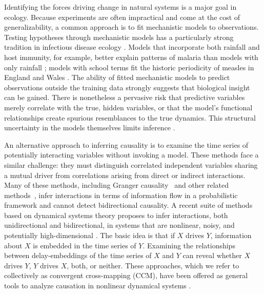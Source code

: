Identifying the forces driving change in natural systems is a major goal in ecology. 
Because experiments are often impractical and come at the cost of generalizability, a common approach is to fit mechanistic models to observations. 
Testing hypotheses through mechanistic models has a particularly strong tradition in infectious disease ecology \cite{KeelingRohani, AndersonMay, Kermack1927, Ross1910}.
Models that incorporate both rainfall and host immunity, for example, better explain patterns of malaria than models with only rainfall \cite{Laneri2010}; models with school terms fit the historic periodicity of measles in England and Wales \cite{Finkenstadt2000, Fine1982}.
The ability of fitted mechanistic models to predict observations outside the training data strongly suggests that biological insight can be gained. There is nonetheless a pervasive risk that predictive variables merely correlate with the true, hidden variables, or that the model's functional relationships create spurious resemblances to the true dynamics. 
This structural uncertainty in the models themselves limits inference \cite{BurnhamAnderson, He2009, Yodzis1988, Wood1999, Grad2012}. 

An alternative approach to inferring causality is to examine the time series of potentially interacting variables without invoking a model. 
These methods face a similar challenge: they must distinguish correlated independent variables sharing a mutual driver from correlations arising from direct or indirect interactions. 
Many of these methods, including Granger causality~\cite{Granger1969} and other related methods~\cite{Schumacher2015,Mooij2014,Stegle2010}, infer interactions in terms of information flow in a probabilistic framework and cannot detect bidirectional causality.
A recent suite of methods based on dynamical systems theory proposes to infer interactions, both unidirectional and bidirectional, in systems that are nonlinear, noisy, and potentially high-dimensional \cite{Sugihara2012, Ye2015, Clark2015}.
The basic idea is that if $X$ drives $Y$, information about $X$ is embedded in the time series of $Y$.
Examining the relationships between delay-embeddings of the time series of $X$ and $Y$ can reveal whether $X$ drives $Y$, $Y$ drives $X$, both, or neither.
These approaches, which we refer to collectively as convergent cross-mapping (CCM), have been offered as general tools to analyze causation in nonlinear dynamical systems \cite{Sugihara2012, Ye2015, Clark2015}.

